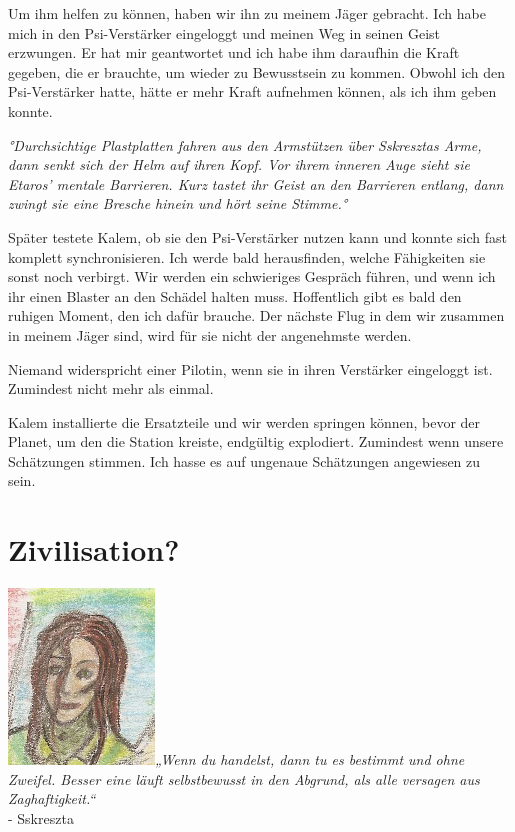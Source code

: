 \documentclass[11pt]{article}
\begin{document}
Um ihm helfen zu können, haben wir ihn zu meinem Jäger gebracht. Ich
habe mich in den Psi-Verstärker eingeloggt und meinen Weg in seinen
Geist erzwungen. Er hat mir geantwortet und ich habe ihm daraufhin die
Kraft gegeben, die er brauchte, um wieder zu Bewusstsein zu kommen.
Obwohl ich den Psi-Verstärker hatte, hätte er mehr Kraft aufnehmen
können, als ich ihm geben konnte.

\emph{°Durchsichtige Plastplatten fahren aus den Armstützen über
Sskresztas Arme, dann senkt sich der Helm auf ihren Kopf. Vor ihrem
inneren Auge sieht sie Etaros' mentale Barrieren. Kurz tastet ihr Geist
an den Barrieren entlang, dann zwingt sie eine Bresche hinein und hört
seine Stimme.°}

Später testete Kalem, ob sie den Psi-Verstärker nutzen kann und konnte
sich fast komplett synchronisieren. Ich werde bald herausfinden, welche
Fähigkeiten sie sonst noch verbirgt. Wir werden ein schwieriges Gespräch
führen, und wenn ich ihr einen Blaster an den Schädel halten muss.
Hoffentlich gibt es bald den ruhigen Moment, den ich dafür brauche. Der
nächste Flug in dem wir zusammen in meinem Jäger sind, wird für sie
nicht der angenehmste werden.

Niemand widerspricht einer Pilotin, wenn sie in ihren Verstärker
eingeloggt ist. Zumindest nicht mehr als einmal.

Kalem installierte die Ersatzteile und wir werden springen können, bevor
der Planet, um den die Station kreiste, endgültig explodiert. Zumindest
wenn unsere Schätzungen stimmen. Ich hasse es auf ungenaue Schätzungen
angewiesen zu sein.

\section{Zivilisation?}

\includegraphics{sskreszta-portrait-alt-klein.png}\emph{„Wenn du
handelst, dann tu es bestimmt und ohne Zweifel. Besser eine läuft
selbstbewusst in den Abgrund, als alle versagen aus Zaghaftigkeit.``}\\
- Sskreszta
\end{document}
